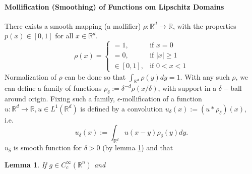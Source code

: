 \documentclass[reqno]{amsart}
\theoremstyle{plain}
\newtheorem{lem}{Lemma}
\theoremstyle{definition}
\newcommand{\bb}[1]{\mathbb{#1}}
\begin{document}
\paragraph{\bf Mollification (Smoothing) of Functions om Lipschitz Domains}
There exists a smooth mapping (a mollifier) $\rho : \bb R^d \to \bb R$, with the properties $p(x) \in [0,1]$ for all $x \in \bb R^d$.
$$
\rho(x) = \begin{cases}
    =1, &\text{if $x=0$}\\
    =0, &\text{if $|x| \geq 1$}\\
    \in [0,1], &\text{if $0 < x < 1$}
\end{cases}
$$
Normalization of $\rho$ can be done so that $\int_{\bb R^d} \rho(y)dy = 1$. With any such $\rho$, we can define a family of functions $\rho_{\delta} := \delta^{-d}\rho(x/\delta)$, with support in a $\delta-$ball around origin. Fixing such a family, $\epsilon$-mollification of a function $u : \bb R^d \to \bb R, u \in L^1(\bb R^d)$ is defined by a convolution $u_{\delta}(x):= (u*\rho_\delta)(x),$ i.e. 
$$ u_\delta(x) := \int_{\bb R^d} u(x-y)\rho_\delta(y)dy.$$
$u_\delta$ is smooth function for $\delta>0$ (by lemma \ref{2}) and that 
\begin{lem}\label{2}
    If $g \in C^\infty_c(\bb R^n)$ and %
\end{lem}
\end{document}
